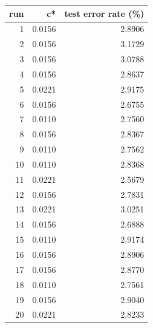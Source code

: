 \begin{tabular}{rrr}
\toprule
run & c* & test error rate (\%) \\
\midrule
1 & 0.0156 & 2.8906 \\
2 & 0.0156 & 3.1729 \\
3 & 0.0156 & 3.0788 \\
4 & 0.0156 & 2.8637 \\
5 & 0.0221 & 2.9175 \\
6 & 0.0156 & 2.6755 \\
7 & 0.0110 & 2.7560 \\
8 & 0.0156 & 2.8367 \\
9 & 0.0110 & 2.7562 \\
10 & 0.0110 & 2.8368 \\
11 & 0.0221 & 2.5679 \\
12 & 0.0156 & 2.7831 \\
13 & 0.0221 & 3.0251 \\
14 & 0.0156 & 2.6888 \\
15 & 0.0110 & 2.9174 \\
16 & 0.0156 & 2.8906 \\
17 & 0.0156 & 2.8770 \\
18 & 0.0110 & 2.7561 \\
19 & 0.0156 & 2.9040 \\
20 & 0.0221 & 2.8233 \\
\bottomrule
\end{tabular}
